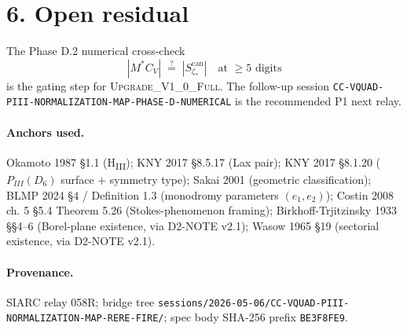 \documentclass[11pt]{article}
\begin{document}
\section*{6. Open residual}

The Phase D.2 numerical cross-check
\[
| M^{*} C_{V} | \;\overset{?}{=}\; | S_{\zeta_{*}}^{\mathrm{can}} |
\quad\text{at } \ge 5 \text{ digits}
\]
is the gating step for \textsc{Upgrade\_V1\_0\_Full}. The follow-up
session \texttt{CC-VQUAD-PIII-NORMALIZATION-MAP-PHASE-D-NUMERICAL}
is the recommended P1 next relay.

\paragraph{Anchors used.}
Okamoto 1987 §1.1 (H\textsubscript{III}); KNY 2017 §8.5.17 (Lax pair);
KNY 2017 §8.1.20 ($P_{III}(D_{6})$ surface + symmetry type);
Sakai 2001 (geometric classification); BLMP 2024 §4 / Definition 1.3
(monodromy parameters $(e_{1}, e_{2})$); Costin 2008 ch. 5 §5.4
Theorem 5.26 (Stokes-phenomenon framing); Birkhoff-Trjitzinsky 1933
§§4–6 (Borel-plane existence, via D2-NOTE v2.1); Wasow 1965 §19
(sectorial existence, via D2-NOTE v2.1).

\paragraph{Provenance.}
SIARC relay 058R; bridge tree
\texttt{sessions/2026-05-06/CC-VQUAD-PIII-NORMALIZATION-MAP-RERE-FIRE/};
spec body SHA-256 prefix \texttt{BE3F8FE9}.
\end{document}
